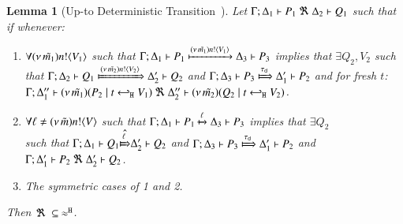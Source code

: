 \documentclass[preprint,11pt]{elsarticle}
\newtheorem{lemma}{Lemma}[section]
\begin{document}
{\begin{lemma}[Up-to Deterministic Transition~\cite{KouzapasPY17}]%
	\label{lem:up_to_deterministic_transition}
	Let $\Gamma; \Delta_1 \vdash P_1 \ \Re\  \Delta_2 \vdash Q_1$ such
	that if whenever:
%
	\begin{enumerate}[1.]
		\item	$\forall (\nu\, \tilde{m_1}) n ! \langle V_1 \rangle$ such that
			$
				\Gamma; \Delta_1 \vdash P_1 \xmapsto{(\nu\, \tilde{m_1}) n !\langle V_1 \rangle} \Delta_3 \vdash P_3
			$
			implies that $\exists Q_2, V_2$ such that
			$
				\horel{\Gamma}{\Delta_2}{Q_1}{\Hby{\news{\tilde{m_2}} \bactout{n}{V_2}}}{\Delta_2'}{Q_2}
			$
			and
			$
				\horel{\Gamma}{\Delta_3}{P_3}{\Hby{\dtau}}{\Delta_1'}{P_2}
			$
			and for fresh $t$:\\
			$
				\Gamma; \Delta_1'' \vdash (\nu\, \tilde{m_1})(P_2 \;|\; t \hookleftarrow_{\mathtt{H}} V_1) \ \Re\  \Delta_2'' \vdash{(\nu\, \tilde{m_2})(Q_2 \;|\;t \hookleftarrow_{\mathtt{H}} V_2)}
			$.
%
		\item	$\forall \ell \not= (\nu\, \tilde{m}) n ! \langle V \rangle$ such that
			$
				\Gamma; \Delta_1 \vdash P_1 \xmapsto{\ell} \Delta_3 \vdash P_3
			$
			implies that $\exists Q_2$  \\ such that 
			$
				\horel{\Gamma}{\Delta_1}{Q_1}{\hat{\Hby{\ell}}}{\Delta_2'}{Q_2}
			$
			and
			$
				\horel{\Gamma}{\Delta_3}{P_3}{\Hby{\dtau}}{\Delta_1'}{P_2}
			$
			and
			$\Gamma; \Delta_1' \vdash P_2 \ \Re\  \Delta_2' \vdash Q_2$.

		\item	The symmetric cases of 1 and 2.
	\end{enumerate}
	Then $\Re\ \subseteq\ \approx^\mathtt{H}$.
\end{lemma}



}
\end{document}
